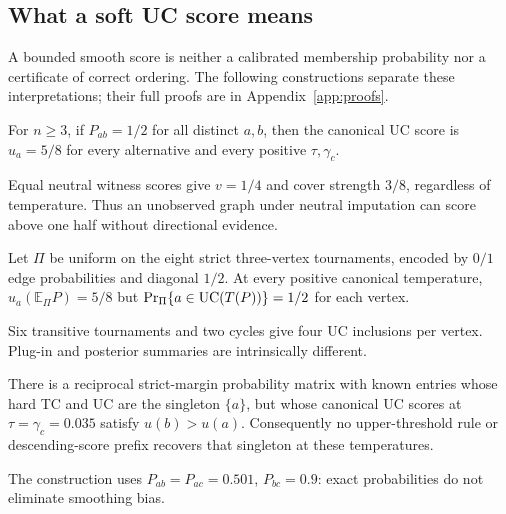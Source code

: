 \subsection{What a soft UC score means}\label{sec:score-meaning}
A bounded smooth score is neither a calibrated membership probability nor a certificate of correct ordering. The following constructions separate these interpretations; their full proofs are in Appendix~\ref{app:proofs}.

\begin{lemma}\label{lem:neutral}
For $n\ge3$, if $P_{ab}=1/2$ for all distinct $a,b$, then the canonical UC score is $u_a=5/8$ for every alternative and every positive $\tau,\gamma_c$.
\end{lemma}
Equal neutral witness scores give $v=1/4$ and cover strength $3/8$, regardless of temperature. Thus an unobserved graph under neutral imputation can score above one half without directional evidence.

\begin{lemma}\label{lem:distinct-summaries}
Let $\Pi$ be uniform on the eight strict three-vertex tournaments, encoded by $0/1$ edge probabilities and diagonal $1/2$. At every positive canonical temperature, $u_a(\mathbb E_\Pi P)=5/8$ but $\Pr_\Pi\{a\in\mathrm{UC}(T(P))\}=1/2$ for each vertex.
\end{lemma}
Six transitive tournaments and two cycles give four UC inclusions per vertex. Plug-in and posterior summaries are intrinsically different.

\begin{proposition}\label{prop:ordering-counterexample}
There is a reciprocal strict-margin probability matrix with known entries whose hard TC and UC are the singleton $\{a\}$, but whose canonical UC scores at $\tau=\gamma_c=0.035$ satisfy $u(b)>u(a)$. Consequently no upper-threshold rule or descending-score prefix recovers that singleton at these temperatures.
\end{proposition}
The construction uses $P_{ab}=P_{ac}=0.501$, $P_{bc}=0.9$: exact probabilities do not eliminate smoothing bias.
